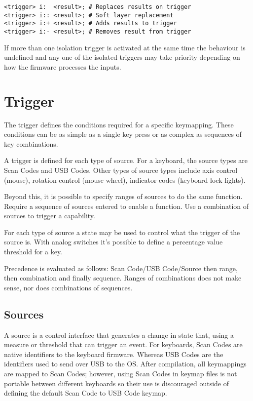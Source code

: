 \documentclass{kiibohd-template}
\begin{document}
\begin{lstlisting}
<trigger> i:  <result>; # Replaces results on trigger
<trigger> i:: <result>; # Soft layer replacement
<trigger> i:+ <result>; # Adds results to trigger
<trigger> i:- <result>; # Removes result from trigger
\end{lstlisting}

If more than one isolation trigger is activated at the same time the behaviour is undefined and any one of the isolated triggers may take priority depending on how the firmware processes the inputs.



\section{Trigger}

The trigger defines the conditions required for a specific keymapping.
These conditions can be as simple as a single key press or as complex as sequences of key combinations.

A trigger is defined for each type of source.
For a keyboard, the source types are Scan Codes and USB Codes.
Other types of source types include axis control (mouse), rotation control (mouse wheel), indicator codes (keyboard lock lights).

Beyond this, it is possible to specify ranges of sources to do the same function.
Require a sequence of sources entered to enable a function.
Use a combination of sources to trigger a capability.

For each type of source a state may be used to control what the trigger of the source is.
With analog switches it's possible to define a percentage value threshold for a key.

Precedence is evaluated as follows: Scan Code/USB Code/Source then range, then combination and finally sequence.
Ranges of combinations does not make sense, nor does combinations of sequences.


\subsection{Sources}

A source is a control interface that generates a change in state that, using a measure or threshold that can trigger an event.
For keyboards, Scan Codes are native identifiers to the keyboard firmware.
Whereas USB Codes are the identifiers used to send over USB to the OS.
After compilation, all keymappings are mapped to Scan Codes; however, using Scan Codes in keymap files is not portable between different keyboards so their use is discouraged outside of defining the default Scan Code to USB Code keymap.
\end{document}
